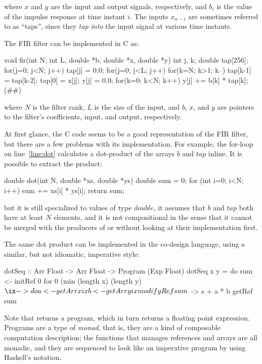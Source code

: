 \documentclass[../paper.tex]{subfiles}
\begin{document}
\noindent where $x$ and $y$ are the input and output signals, respectively, and $b_i$ is the value of the impulse response at time instant $i$. The inputs $x_{n-i}$ are sometimes referred to as ``taps'', since they \textit{tap into} the input signal at various time instants. 

The FIR filter can be implemented in C as:

\begin{code}
void fir(int N, int L, double *b, double *x, double *y) {
 int j, k;
 double tap[256];
 for(j=0; j<N; j++) tap[j] = 0.0;
 for(j=0; j<L; j++) {
  for(k=N; k>1; k--) tap[k-1] = tap[k-2];
  tap[0] = x[j];
  y[j] = 0.0;
  for(k=0; k<N; k++) y[j] += b[k] * tap[k]; (#\label{line:dot}#)
 }
}
\end{code}

\noindent where $N$ is the filter rank, $L$ is the size of the input, and $b$, $x$, and $y$ are pointers to the filter's coefficients, input, and output, respectively.

At first glance, the C code seems to be a good representation of the FIR filter, but there are a few problems with its implementation. For example, the for-loop on line~\ref{line:dot} calculates a dot-product of the arrays $b$ and $tap$ inline. It is possible to extract the product:

\begin{code}
double dot(int N, double *xs, double *ys) {
  double sum = 0;
  for (int i=0; i<N; i++) sum += xs[i] * ys[i];
  return sum;
}
\end{code}

\noindent but it is still specialized to values of type $double$, it assumes that $b$ and $tap$ both have at least $N$ elements, and it is not compositional in the sense that it cannot be merged with the producers of  or  without looking at their implementation first.

The same dot product can be implemented in the co-design language, using a similar, but not idiomatic, imperative style:

\begin{code}
dotSeq :: Arr Float -> Arr Float -> Program (Exp Float)
dotSeq x y = do
  sum <- initRef 0
  for 0 (min (length x) (length y) $ \ix -> do
    a <- getArr x ix
    b <- getArr y ix
    modifyRef sum $ \s -> s + a * b
  getRef sum
\end{code}

\noindent Note that  returns a program, which in turn returns a floating point expression. Programs are a type of \textit{monad}, that is, they are a kind of composable computation description; the functions that manages references and arrays are all monadic, and they are sequenced to look like an imperative program by using Haskell's  notation.
\end{document}
